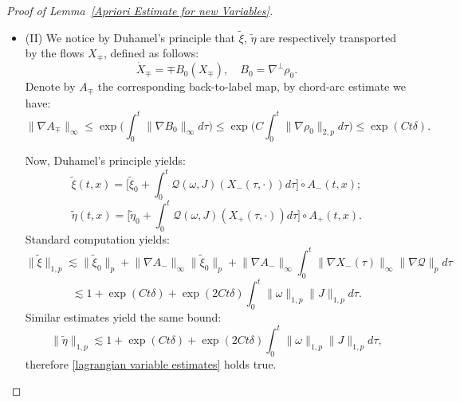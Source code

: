 \documentclass[12pt,letterpaper]{article}
\theoremstyle{plain}
\begin{document}
\begin{proof}[Proof of Lemma~\ref{Apriori Estimate for new Variables}]
\begin{itemize}
    \item [](II) We notice by Duhamel's principle that $\tilde\xi$, $\tilde\eta$ are respectively transported by the flows $X_\mp$, defined as follows:
    \begin{equation*}
       \dot X_\mp=\mp B_0(X_\mp),\quad B_0=\nabla^\perp\rho_0 .
    \end{equation*}
    Denote by $A_\mp$ the corresponding back-to-label map, by chord-arc estimate we have:
    \begin{equation*}
     \lVert\nabla A_\mp\rVert_\infty\le \exp\bigg(\int_0^t\lVert\nabla B_0\rVert_\infty d\tau\bigg) \le  \exp\bigg(C\int_0^t\lVert\nabla\rho_0\rVert_{2,p} d\tau\bigg) \le \exp(Ct\delta).
    \end{equation*}
    
    Now, Duhamel's principle yields:
    \begin{equation*}
     \tilde\xi(t,x)=\bigg[\tilde\xi_0+\int_0^t  \mathscr Q(\omega,J)(X_-(\tau,\cdot))d\tau\bigg]\circ A_-(t,x) ;
    \end{equation*}
    \begin{equation*}
     \tilde\eta(t,x)=\bigg[\tilde\eta_0+\int_0^t  \mathscr Q(\omega,J)(X_+(\tau,\cdot))d\tau\bigg]\circ A_+(t,x) .
    \end{equation*}
    Standard computation yields:
    \begin{equation*}
     \lVert\tilde\xi\rVert_{1,p}\lesssim \lVert \tilde\xi_0\rVert_p+\lVert\nabla A_-\rVert_\infty\lVert \tilde\xi_0\rVert_p+\lVert\nabla A_-\rVert_\infty\int_0^t \lVert\nabla X_-(\tau)\rVert_\infty \lVert\nabla \mathscr Q\rVert_pd\tau
    \end{equation*}
    \begin{equation*}
   \lesssim     1+\exp(Ct\delta)+\exp(2Ct\delta)\int_0^t\lVert\omega\rVert_{1,p}\lVert  J\rVert_{1,p}d\tau.
    \end{equation*}
    Similar estimates yield the same bound:
      \begin{equation*}
     \lVert\tilde\eta\rVert_{1,p}\lesssim 1+\exp(Ct\delta)+\exp(2Ct\delta)\int_0^t\lVert\omega\rVert_{1,p}\lVert  J\rVert_{1,p}d\tau,
    \end{equation*}
therefore \eqref{lagrangian variable estimates} holds true.


\end{itemize}
\end{proof}
\end{document}
